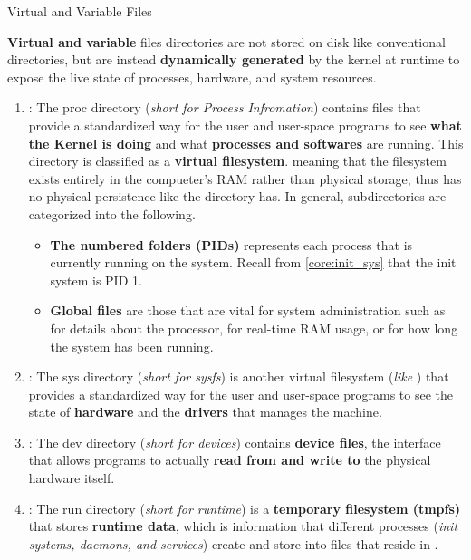 \documentclass[10pt]{article}
\begin{document}
    \begin{core}[label=core:vv_files]{Virtual and Variable Files}

      \textbf{Virtual and variable} files directories are not stored on disk like conventional directories, but are instead \textbf{dynamically generated} by the kernel at runtime to expose the live state of processes, hardware, and system resources.

      \begin{enumerate}

        \item {} : The proc directory (\textit{short for Process Infromation}) contains files that provide a standardized way for the user and user-space programs to see \textbf{what the Kernel is doing} and what \textbf{processes and softwares} are running. This directory is classified as a \textbf{virtual filesystem}. meaning that the filesystem exists entirely in the compueter's RAM rather than physical storage, thus has no physical persistence like the  directory has. In general,  subdirectories are categorized into the following.

        \begin{itemize}

          \item \textbf{The numbered folders (PIDs)} represents each process that is currently running on the system. Recall from \autoref{core:init_sys} that the init system  is PID 1.

          \item \textbf{Global files} are those that are vital for system administration such as  for details about the processor,  for real-time RAM usage, or  for how long the system has been running.

        \end{itemize}

        \item {} : The sys directory (\textit{short for sysfs}) is another virtual filesystem (\textit{like }) that provides a standardized way for the user and user-space programs to see the state of \textbf{hardware} and the \textbf{drivers} that manages the machine.

        \item {} : The dev directory (\textit{short for devices}) contains \textbf{device files}, the interface that allows programs to actually \textbf{read from and write to} the physical hardware itself.

        \item {} : The run directory (\textit{short for runtime}) is a \textbf{temporary filesystem (tmpfs)} that stores \textbf{runtime data}, which is information that different processes (\textit{init systems, daemons, and services}) create and store into files that reside in .

      \end{enumerate}

    \end{core}
\end{document}
